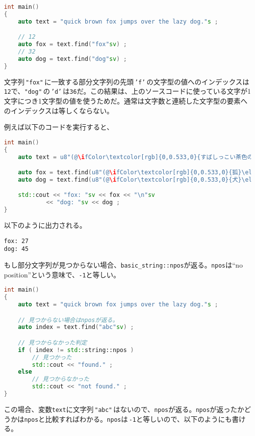\begin{lstlisting}[language={C++}]
int main()
{
    auto text = "quick brown fox jumps over the lazy dog."s ;

    // 12
    auto fox = text.find("fox"sv) ;
    // 32
    auto dog = text.find("dog"sv) ;
}
\end{lstlisting}

文字列\,\texttt{"fox"}\,に一致する部分文字列の先頭\,\texttt{'f'}\,の文字型の値へのインデックスは\texttt{12}で、\texttt{"dog"}\,の\,\texttt{'d'}\,は\texttt{36}だ。この結果は、上のソースコードに使っている文字が1文字につき1文字型の値を使うためだ。通常は文字数と連続した文字型の要素へのインデックスは等しくならない。

例えば以下のコードを実行すると、
\begin{lstlisting}[language={C++}]
int main()
{
    auto text = u8"(@\ifColor\textcolor[rgb]{0,0.533,0}{すばしっこい茶色の狐がノロマな犬を飛び越した。}\else\textcolor{black}{すばしっこい茶色の狐がノロマな犬を飛び越した。}\fi@)"s ;

    auto fox = text.find(u8"(@\ifColor\textcolor[rgb]{0,0.533,0}{狐}\else\textcolor{black}{狐}\fi@)"sv) ;
    auto dog = text.find(u8"(@\ifColor\textcolor[rgb]{0,0.533,0}{犬}\else\textcolor{black}{犬}\fi@)"sv) ;

    std::cout << "fox: "sv << fox << "\n"sv
            << "dog: "sv << dog ;
}
\end{lstlisting}
以下のように出力される。
\begin{lstlisting}[style=terminal]
fox: 27
dog: 45
\end{lstlisting}

もし部分文字列が見つからない場合、\texttt{basic\_string::npos}が返る。\texttt{npos}は``no position''という意味で、\texttt{-1}と等しい。

\ifTombow\pagebreak\fi
\begin{lstlisting}[language={C++}]
int main()
{
    auto text = "quick brown fox jumps over the lazy dog."s ;

    // 見つからない場合はnposが返る。  
    auto index = text.find("abc"sv) ;

    // 見つからなかった判定
    if ( index != std::string::npos )
        // 見つかった
        std::cout << "found." ;
    else
        // 見つからなかった
        std::cout << "not found." ;
}
\end{lstlisting}

この場合、変数\texttt{text}に文字列\,\texttt{"abc"}\,はないので、\texttt{npos}が返る。\texttt{npos}が返ったかどうかは\texttt{npos}と比較すればわかる。\texttt{npos}は\,\texttt{-1}と等しいので、以下のようにも書ける。


